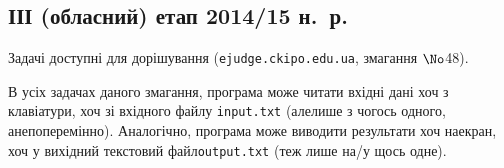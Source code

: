 \renewenvironment{problemAllDefault}[1]{\vspace{10mm}\par\begin{problem}{#1}{\stdinOrInputTxt}{\stdoutOrOutputTxt}{1 сек}{64 мегабайти}}{\end{problem}}

\subsection{ІІІ (обласний) етап 2014/15 н.~р.}

Задачі доступні для дорішування (\verb"ejudge.ckipo.edu.ua", змагання $\No$48).

В усіх задачах даного змагання, програма може читати вхідні дані хоч з клавіатури, хоч зі вхідного файлу \verb"input.txt" (але\nolinebreak[2] лише з чогось одного, а\nolinebreak[3] не\nolinebreak[2] поперемінно). Аналогічно, програма може виводити результати хоч на\nolinebreak[3] екран, хоч у вихідний текстовий файл\nolinebreak[2] \verb"output.txt" (теж лише на/у щось одне).


\vspace{-0.5\baselineskip minus 1cm}
	

	

	

	


